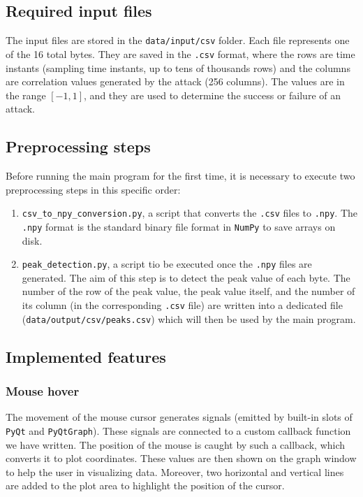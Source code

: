 \documentclass[11pt,a4paper]{article}
\begin{document}
\subsection{Required input files}
The input files are stored in the \texttt{data/input/csv} folder. Each file represents one of the 16 total bytes.
They are saved in the \texttt{.csv} format, where the rows are time instants (sampling time instants, up to tens of thousands rows) and the columns are correlation values generated by the attack (256 columns).
The values are in the range $[-1, 1]$, and they are used to determine the success or failure of an attack.

\subsection{Preprocessing steps}
Before running the main program for the first time, it is necessary to execute two preprocessing steps in this specific order:
\begin{enumerate}
    \item \texttt{csv\_to\_npy\_conversion.py}, a script that converts the \texttt{.csv} files to \texttt{.npy}. The \texttt{.npy} format is the standard binary file format in \texttt{NumPy} to save arrays on disk.
    \item \texttt{peak\_detection.py}, a script tio be executed once the \texttt{.npy} files are generated. The aim of this step is to detect the peak value of each byte. The number of the row of the peak value, the peak value itself, and the number of its column (in the corresponding \texttt{.csv} file) are written into a dedicated file (\texttt{data/output/csv/peaks.csv}) which will then be used by the main program.
\end{enumerate}

\subsection{Implemented features}
\subsubsection{Mouse hover}
The movement of the mouse cursor generates signals (emitted by built-in slots of \texttt{PyQt} and \texttt{PyQtGraph}).
These signals are connected to a custom callback function we have written.
The position of the mouse is caught by such a callback, which converts it to plot coordinates.
These values are then shown on the graph window to help the user in visualizing data.
Moreover, two horizontal and vertical lines are added to the plot area to highlight the position of the cursor.
\end{document}
